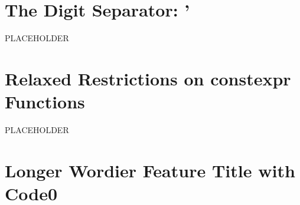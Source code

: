 

\renewcommand{\cppxx}{C++14}

\newpage
{}
\section[Digit Separators]{The Digit Separator: {\SecCode '}}
\label{digitseparator} %
\label{digit-separators} %
\setcounter{table}{0}
\setcounter{footnote}{0}
\setcounter{lstlisting}{0}
PLACEHOLDER

\newpage
\section[{\tt constexpr} Functions '14]{Relaxed Restrictions on {\SecCode constexpr} Functions}
\setcounter{table}{0}
\setcounter{footnote}{0}
\setcounter{lstlisting}{0}
PLACEHOLDER

\newpage
\section[{\tt code0} in Short]{Longer Wordier Feature Title with {\SecCode Code0}}\label{Feature}\label{testmaterial}
\setcounter{table}{0}
\setcounter{footnote}{0}
\setcounter{lstlisting}{0}






